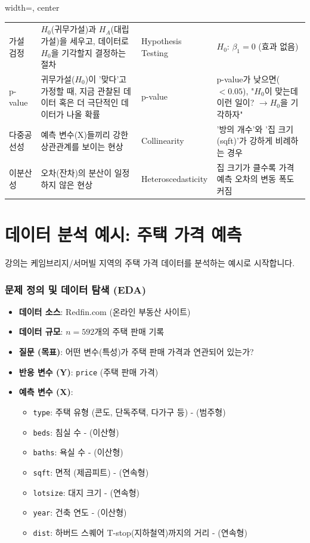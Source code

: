 \documentclass[11pt,a4paper]{book}
\theoremstyle{definition}
\begin{document}
\begin{adjustbox}{width=\textwidth, center}
\begin{tabular}{lp{6cm}p{4cm}l}
가설 검정 & $H_0$(귀무가설)과 $H_A$(대립가설)을 세우고, 데이터로 $H_0$을 기각할지 결정하는 절차 & Hypothesis Testing & $H_0$: $\beta_1 = 0$ (효과 없음) \\
p-value & 귀무가설($H_0$)이 '맞다'고 가정할 때, 지금 관찰된 데이터 혹은 더 극단적인 데이터가 나올 확률 & p-value & p-value가 낮으면($<0.05$), "$H_0$이 맞는데 이런 일이? $\to H_0$을 기각하자" \\
다중공선성 & 예측 변수(X)들끼리 강한 상관관계를 보이는 현상 & Collinearity & '방의 개수'와 '집 크기(sqft)'가 강하게 비례하는 경우 \\
이분산성 & 오차(잔차)의 분산이 일정하지 않은 현상 & Heteroscedasticity & 집 크기가 클수록 가격 예측 오차의 변동 폭도 커짐 \\
\bottomrule
\end{tabular}
\end{adjustbox}
\caption{제9강 핵심 용어 정리표}
\label{table:terms}


\part{데이터 분석 예시: 주택 가격 예측}
\label{part:example}

강의는 케임브리지/서머빌 지역의 주택 가격 데이터를 분석하는 예시로 시작합니다.

\section{문제 정의 및 데이터 탐색 (EDA)}

\begin{itemize}
    \item \textbf{데이터 소스}: Redfin.com (온라인 부동산 사이트)
    \item \textbf{데이터 규모}: $n=592$개의 주택 판매 기록
    \item \textbf{질문 (목표)}: 어떤 변수(특성)가 주택 판매 가격과 연관되어 있는가?
    \item \textbf{반응 변수 (Y)}: \texttt{price} (주택 판매 가격)
    \item \textbf{예측 변수 (X)}:
        \begin{itemize}
            \item \texttt{type}: 주택 유형 (콘도, 단독주택, 다가구 등) - (범주형)
            \item \texttt{beds}: 침실 수 - (이산형)
            \item \texttt{baths}: 욕실 수 - (이산형)
            \item \texttt{sqft}: 면적 (제곱피트) - (연속형)
            \item \texttt{lotsize}: 대지 크기 - (연속형)
            \item \texttt{year}: 건축 연도 - (이산형)
            \item \texttt{dist}: 하버드 스퀘어 T-stop(지하철역)까지의 거리 - (연속형)
        \end{itemize}
\end{itemize}
\end{document}
